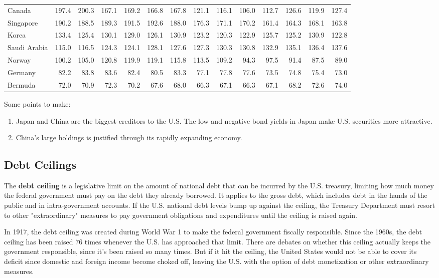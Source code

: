 \documentclass{article}
\begin{document}
\begin{table}[H]
\begin{tabular}{lrrrrrrrrrrrrr}
      Canada & 197.4 & 200.3 & 167.1 & 169.2 & 166.8 & 167.8 & 121.1 & 116.1 & 106.0 & 112.7 & 126.6 & 119.9 & 127.4 \\
      Singapore & 190.2 & 188.5 & 189.3 & 191.5 & 192.6 & 188.0 & 176.3 & 171.1 & 170.2 & 161.4 & 164.3 & 168.1 & 163.8 \\
      Korea & 133.4 & 125.4 & 130.1 & 129.0 & 126.1 & 130.9 & 123.2 & 120.3 & 122.9 & 125.7 & 125.2 & 130.9 & 122.8 \\
      Saudi Arabia & 115.0 & 116.5 & 124.3 & 124.1 & 128.1 & 127.6 & 127.3 & 130.3 & 130.8 & 132.9 & 135.1 & 136.4 & 137.6 \\
      Norway & 100.2 & 105.0 & 120.8 & 119.9 & 119.1 & 115.8 & 113.5 & 109.2 & 94.3 & 97.5 & 91.4 & 87.5 & 89.0 \\
      Germany & 82.2 & 83.8 & 83.6 & 82.4 & 80.5 & 83.3 & 77.1 & 77.8 & 77.6 & 73.5 & 74.8 & 75.4 & 73.0 \\
      Bermuda & 72.0 & 70.9 & 72.3 & 70.2 & 67.6 & 68.0 & 66.3 & 67.1 & 66.3 & 67.1 & 68.2 & 72.6 & 74.0 \\
      \hline
      \end{tabular}
    \end{table}

    Some points to make:
    \begin{enumerate}
      \item Japan and China are the biggest creditors to the U.S. The low and negative bond yields in Japan make U.S. securities more attractive.
      \item China's large holdings is justified through its rapidly expanding economy.
    \end{enumerate}

  \subsection{Debt Ceilings}

    The \textbf{debt ceiling} is a legislative limit on the amount of national debt that can be incurred by the U.S. treasury, limiting how much money the federal government must pay on the debt they already borrowed. It applies to the gross debt, which includes debt in the hands of the public and in intra-government accounts. If the U.S. national debt levels bump up against the ceiling, the Treasury Department must resort to other "extraordinary" measures to pay government obligations and expenditures until the ceiling is raised again.

    In 1917, the debt ceiling was created during World War 1 to make the federal government fiscally responsible. Since the 1960s, the debt ceiling has been raised 76 times whenever the U.S. has approached that limit. There are debates on whether this ceiling actually keeps the government responsible, since it's been raised so many times. But if it hit the ceiling, the United States would not be able to cover its deficit since domestic and foreign income become choked off, leaving the U.S. with the option of debt monetization or other extraordinary measures.
\end{document}
